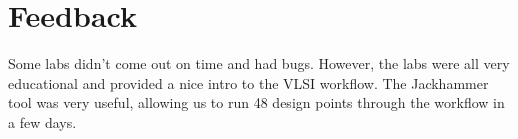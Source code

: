 \section{Feedback}

Some labs didn't come out on time and had bugs. However, the labs
were all very educational and provided a nice intro to the VLSI workflow.
The Jackhammer tool was very useful, allowing us to run 48 design points
through the workflow in a few days.
